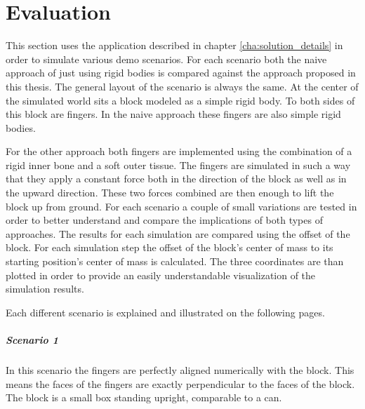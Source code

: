 \chapter{Evaluation}
\label{cha:evaluation}

This section uses the application described in chapter \ref{cha:solution_details} in order to simulate various demo scenarios. For each scenario both the naive approach of just using rigid bodies is compared against the approach proposed in this thesis. The general layout of the scenario is always the same. At the center of the simulated world sits a block modeled as a simple rigid body. To both sides of this block are fingers. In the naive approach these fingers are also simple rigid bodies. 

For the other approach both fingers are implemented using the combination of a rigid inner bone and a soft outer tissue. The fingers are simulated in such a way that they apply a constant force both in the direction of the block as well as in the upward direction. These two forces combined are then enough to lift the block up from ground. For each scenario a couple of small variations are tested in order to better understand and compare the implications of both types of approaches. The results for each simulation are compared using the offset of the block. For each simulation step the offset of the block's center of mass to its starting position's center of mass is calculated. The three coordinates are than plotted in order to provide an easily understandable visualization of the simulation results. 

Each different scenario is explained and illustrated on the following pages.

\clearpage

\paragraph{Scenario 1}
In this scenario the fingers are perfectly aligned numerically with the block. This means the faces of the fingers are exactly perpendicular to the faces of the block. The block is a small box standing upright, comparable to a can.

